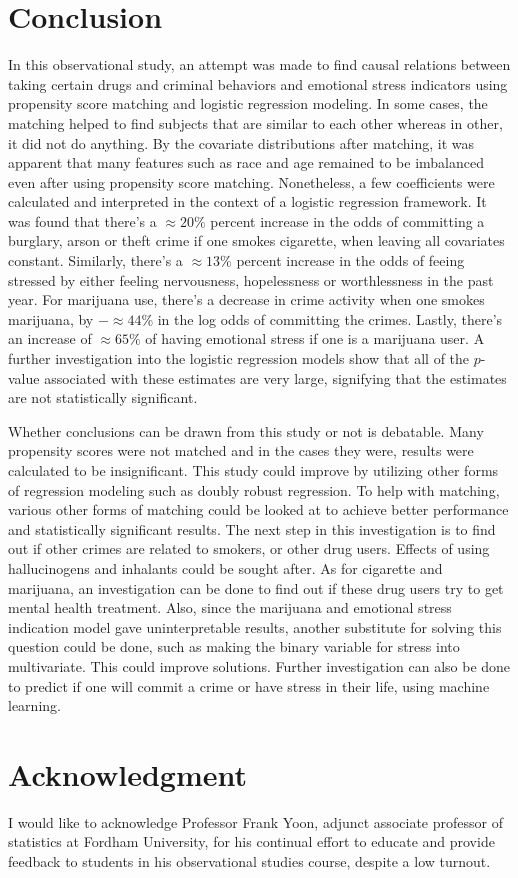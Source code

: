 \documentclass[a4paper, 10pt, conference]{ieeeconf}
\begin{document}
\section{Conclusion}

In this observational study, an attempt was made to find causal relations between taking certain drugs and criminal behaviors and emotional stress indicators using propensity score matching and logistic regression modeling. In some cases, the matching helped to find subjects that are similar to each other whereas in other, it did not do anything. By the covariate distributions after matching, it was apparent that many features such as race and age remained to be imbalanced even after using propensity score matching. Nonetheless, a few coefficients were calculated and interpreted in the context of a logistic regression framework. It was found that there's a $\approx 20\%$ percent increase in the odds of committing a burglary, arson or theft crime if one smokes cigarette, when leaving all covariates constant. Similarly, there's a $\approx 13\%$ percent increase in the odds of feeing stressed by either feeling nervousness, hopelessness or worthlessness in the past year. For marijuana use, there's a decrease in crime activity when one smokes marijuana, by $-\approx 44\%$ in the log odds of committing the crimes. Lastly, there's an increase of $\approx 65\%$ of having emotional stress if one is a marijuana user. A further investigation into the logistic regression models show that all of the $p$-value associated with these estimates are very large, signifying that the estimates are not statistically significant. 

Whether conclusions can be drawn from this study or not is debatable. Many propensity scores were not matched and in the cases they were, results were calculated to be insignificant. This study could improve by utilizing other forms of regression modeling such as doubly robust regression. To help with matching, various other forms of matching could be looked at to achieve better performance and statistically significant results. The next step in this investigation is to find out if other crimes are related to smokers, or other drug users. Effects of using hallucinogens and inhalants could be sought after. As for cigarette and marijuana, an investigation can be done to find out if these drug users try to get mental health treatment. Also, since the marijuana and emotional stress indication model gave uninterpretable results, another substitute for solving this question could be done, such as making the binary variable for stress into multivariate. This could improve solutions. Further investigation can also be done to predict if one will commit a crime or have stress in their life, using machine learning. 

\section*{Acknowledgment}

I would like to acknowledge Professor Frank Yoon, adjunct associate professor of statistics at Fordham University, for his continual effort to educate and provide feedback to students in his observational studies course, despite a low turnout.
\end{document}
